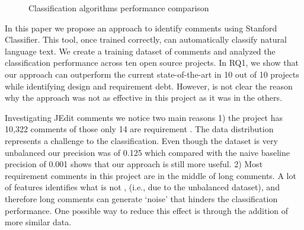 \begin{figure}[!thb]
  \centering
  \caption{Classification algorithms performance comparison}
  \label{fig:algorithms_comparison}
\end{figure}

In this paper we propose an approach to identify \SATD comments using Stanford Classifier. This tool, once trained correctly, can automatically classify natural language text. We create a training dataset of \SATD comments and analyzed the classification performance across ten open source projects. In RQ1, we show that our approach can outperform the current state-of-the-art in 10 out of 10 projects while identifying design and requirement debt. However, is not clear the reason why the approach was not as effective in this project as it was in the others.

Investigating JEdit comments we notice two main reasons 1) the project has 10,322 comments of those only 14 are requirement \SATD. The data distribution represents a challenge to the classification. Even though the dataset is very unbalanced our precision was of 0.125 which compared with the naive baseline precision of 0.001 shows that our approach is still more useful. 2) Most requirement \SATD comments in this project are in the middle of long comments. A lot of features identifies what is not \SATD, (i.e., due to the unbalanced dataset), and therefore long comments can generate `noise' that hinders the classification performance. One possible way to reduce this effect is through the addition of more similar data. 

